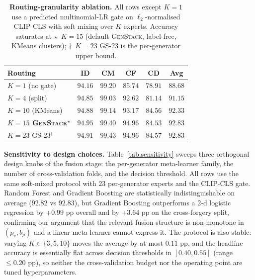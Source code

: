 \documentclass[10pt,twocolumn,letterpaper]{article}
\begin{document}
\begin{table}[t]
\centering
\footnotesize
\setlength{\tabcolsep}{2pt}
\caption{\textbf{Routing-granularity ablation.} All rows except $K{=}1$ use a predicted multinomial-LR gate on $\ell_2$-normalised CLIP CLS with soft mixing over $K$ experts. Accuracy saturates at $\star$~$K{=}15$ (default \textsc{GenStack}, label-free, KMeans clusters); $\dag$~$K{=}23$ \textsc{GS-23} is the per-generator upper bound.}
\label{tab:routing}
\begin{tabular}{l c c c c c}
\toprule
Routing & ID & CM & CF & CD & Avg \\
\midrule
$K{=}1$ (no gate)                  & $94.16$ & $99.20$ & $85.74$ & $78.91$ & $88.68$ \\
$K{=}4$ (split)                    & $94.85$ & $99.03$ & $92.62$ & $81.14$ & $91.15$ \\
$K{=}10$ (KMeans)                  & $94.88$ & $99.14$ & $93.17$ & $84.56$ & $92.33$ \\
\textbf{$K{=}15$ \textsc{GenStack}\ensuremath{^\star}}   & $\mathbf{94.95}$ & $99.40$ & $\mathbf{94.96}$ & $84.53$ & $\mathbf{92.83}$ \\
$K{=}23$ \textsc{GS-23}\ensuremath{^\dag}              & $94.91$ & $\mathbf{99.43}$ & $\mathbf{94.96}$ & $\mathbf{84.57}$ & $\mathbf{92.83}$ \\
\bottomrule
\end{tabular}
\end{table}

\textbf{Sensitivity to design choices.}
\label{sec:sensitivity}
Table~\ref{tab:sensitivity} sweeps three orthogonal design knobs of the fusion stage: the per-generator meta-learner family, the number of cross-validation folds, and the decision threshold. All rows use the same soft-mixed protocol with $23$ per-generator experts and the CLIP-CLS gate. Random Forest and Gradient Boosting are statistically indistinguishable on average ($92.82$ vs $92.83$), but Gradient Boosting outperforms a 2-d logistic regression by $+0.99$ pp overall and by $+3.64$ pp on the cross-forgery split, confirming our argument that the relevant fusion structure is non-monotone in $(p_v, b_p)$ and a linear meta-learner cannot express it. The protocol is also stable: varying $K\in\{3,5,10\}$ moves the average by at most $0.11$ pp, and the headline accuracy is essentially flat across decision thresholds in $[0.40, 0.55]$ (range $\leq\!0.20$ pp), so neither the cross-validation budget nor the operating point are tuned hyperparameters.
\end{document}
